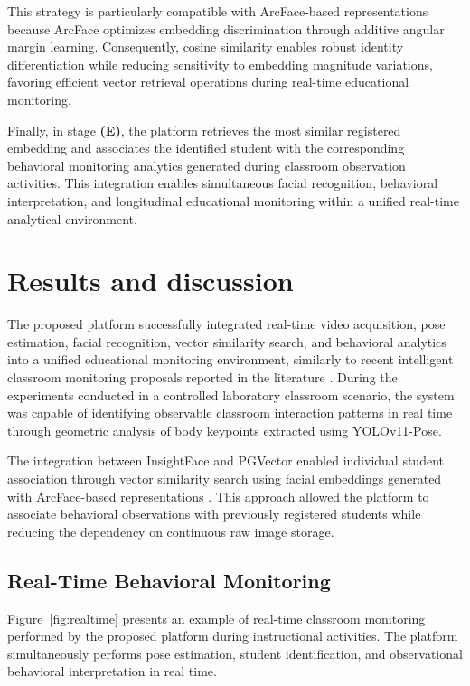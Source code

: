 \documentclass[12pt,a4paper]{article}
\begin{document}
This strategy is particularly compatible with ArcFace-based representations \cite{dengArcFaceAdditiveAngular} because ArcFace optimizes embedding discrimination through additive angular margin learning. Consequently, cosine similarity enables robust identity differentiation while reducing sensitivity to embedding magnitude variations, favoring efficient vector retrieval operations during real-time educational monitoring.

Finally, in stage \textbf{(E)}, the platform retrieves the most similar registered embedding and associates the identified student with the corresponding behavioral monitoring analytics generated during classroom observation activities. This integration enables simultaneous facial recognition, behavioral interpretation, and longitudinal educational monitoring within a unified real-time analytical environment.

\section{Results and discussion}

The proposed platform successfully integrated real-time video acquisition, pose estimation, facial recognition, vector similarity search, and behavioral analytics into a unified educational monitoring environment, similarly to recent intelligent classroom monitoring proposals reported in the literature \cite{mitomaBehaviorMonitoringSystem2025,huRealTimeClassroomBehavior2024}. During the experiments conducted in a controlled laboratory classroom scenario, the system was capable of identifying observable classroom interaction patterns in real time through geometric analysis of body keypoints extracted using YOLOv11-Pose.

The integration between InsightFace and PGVector enabled individual student association through vector similarity search using facial embeddings generated with ArcFace-based representations \cite{dengArcFaceAdditiveAngular}. This approach allowed the platform to associate behavioral observations with previously registered students while reducing the dependency on continuous raw image storage.

\subsection{Real-Time Behavioral Monitoring}
Figure~\ref{fig:realtime} presents an example of real-time classroom monitoring performed by the proposed platform during instructional activities. The platform simultaneously performs pose estimation, student identification, and observational behavioral interpretation in real time.
\end{document}
